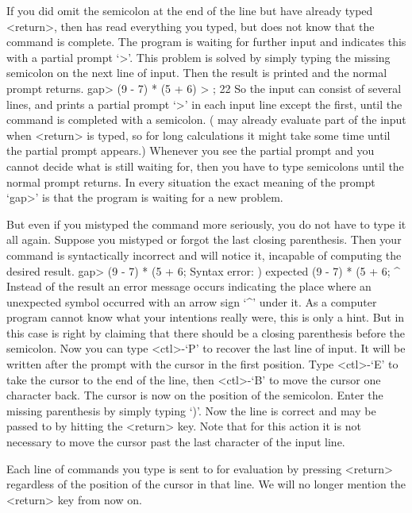 If you did omit the semicolon at the end of  the line but have already
typed  <return>, then {\GAP} has  read  everything you typed, but does
not know  that the command  is  complete.  The program is  waiting for
further  input and indicates  this with  a  partial prompt `>'.   This
problem is solved by simply  typing the missing  semicolon on the next
line  of  input. Then  the result  is printed   and  the normal prompt
returns.
\beginexample
gap> (9 - 7) * (5 + 6)
> ;
22 
\endexample
So the input can consist of several lines, and {\GAP} prints a partial
prompt `>' in each input line except the first, until the command is
completed with a semicolon.
({\GAP} may already evaluate part of the input when <return> is typed,
so for long calculations it might take some time until the partial prompt
appears.)
Whenever you see the partial prompt and you cannot decide what {\GAP} is
still  waiting for, then  you have  to type  semicolons  until the normal
prompt returns.
In  every situation the exact meaning of the prompt `gap>' is that the
program is waiting for a new problem.

But even if you  mistyped the command more  seriously, you do not have to
type   it all again. Suppose   you  mistyped or  forgot  the last closing
parenthesis. Then your command is syntactically incorrect and {\GAP} will
notice it, incapable of computing the desired result.
\begintt
gap> (9 - 7) * (5 + 6;
Syntax error: ) expected
(9 - 7) * (5 + 6;
                ^
\endtt
{}%
Instead of the result an error message  occurs indicating the place where
an unexpected  symbol occurred with   an arrow sign  `^'  under it.  As a
computer program  cannot know what your  intentions really were,  this is
only  a hint. But in this  case {\GAP}  is  right by  claiming that there
should be a closing  parenthesis before the  semicolon. Now you  can type
<ctl>-`P' to recover the last line of input. It will be written after the
prompt with the cursor in the first  position. Type <ctl>-`E' to take the
cursor  to the end of   the line, then <ctl>-`B'   to move the cursor one
character back. The cursor is now on the position of the semicolon. Enter
the missing parenthesis by simply typing `)'. Now the line is correct and
may be passed to {\GAP}  by hitting the <return>  key. Note that for this
action it is not necessary to move the cursor  past the last character of
the input line.

Each line  of commands  you  type is sent to    {\GAP} for evaluation  by
pressing <return> regardless of the position of  the cursor in that line.
We will no longer mention the <return> key from now on.

